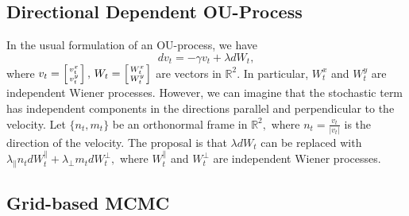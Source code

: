 %
%
%
%

\subsection*{Directional Dependent OU-Process}

In the usual formulation of an OU-process, we have
\begin{equation}
dv_{t}=-\gamma v_{t}+\lambda dW_{t},
\end{equation}
where $v_{t}=\left[{v_{t}^{x}\atop v_{t}^{y}}\right],\,W_{t}=\left[{W_{t}^{x}\atop W_{t}^{y}}\right]$
are vectors in $\mathbb{R}^{2}.$ In particular, $W_{t}^{x}$ and
$W_{t}^{y}$ are independent Wiener processes. However, we can imagine
that the stochastic term has independent components in the directions
parallel and perpendicular to the velocity. Let $\{n_{t},m_{t}\}$
be an orthonormal frame in $\mathbb{R}^{2},$ where $n_{t}=\frac{v_{t}}{|v_{t}|}$
is the direction of the velocity. The proposal is that $\lambda dW_{t}$
can be replaced with $\lambda_{\parallel}n_{t}dW_{t}^{\parallel}+\lambda_{\perp}m_{t}dW_{t}^{\perp},$
where $W_{t}^{\parallel}$ and $W_{t}^{\perp}$ are independent Wiener
processes.


\subsection*{Grid-based MCMC}

